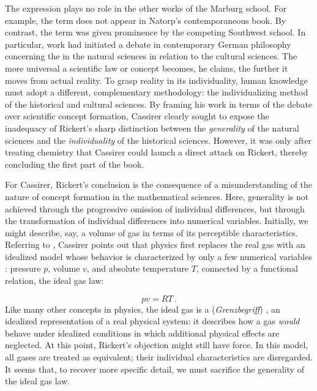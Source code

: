 \documentclass[submitted,12pt]{article}
\begin{document}
The expression   plays no role in the other works of the Marburg school. For example, the term does not appear in Natorp's contemporaneous \citeyear{Natorp1910a} book. By contrast, the term was given prominence by the competing Southwest school. In particular,  work had initiated a debate in contemporary German philosophy concerning the  in the natural sciences in relation to the cultural sciences. The more universal a scientific law or concept becomes, he claims, the further it moves from actual reality. To grasp reality in its individuality, human knowledge must adopt a different, complementary methodology: the individualizing method of the historical and cultural sciences. By framing his work in terms of the debate over scientific concept formation, Cassirer clearly sought to expose the inadequacy of Rickert's sharp distinction between the \emph{generality} of the natural sciences and the \emph{individuality} of the historical sciences. However, it was only after treating chemistry that Cassirer could launch a direct attack on Rickert, thereby concluding the first part of the book.

For Cassirer, Rickert's conclusion is the consequence of a misunderstanding of the nature of concept formation in the mathematical sciences. Here, generality is not achieved through the progressive omission of individual differences, but through the transformation of individual differences into numerical variables. Initially, we might describe, say, a volume of gas in terms of its perceptible characteristics. Referring to \citet{Duhem1906}, Cassirer points out that physics first replaces the real gas with an idealized model whose behavior is characterized by only a few numerical variables : pressure $p$, volume $v$, and absolute temperature $T$, connected by a functional relation, the ideal gas law:  

\begin{equation*}
pv=RT\,.  
\end{equation*}
%
Like many other concepts in physics, the ideal gas is a  (\emph{Grenzbegriff}) , an idealized representation of a real physical system: it describes how a gas \emph{would} behave under idealized conditions in which additional physical effects are neglected. At this point, Rickert's objection might still have force. In this model, all gases are treated as equivalent; their individual characteristics are disregarded. It seems that, to recover more specific detail, we must sacrifice the generality of the ideal gas law.
\end{document}
